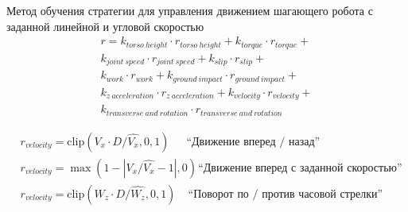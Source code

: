 \begin{frame}{Метод обучения стратегии для управления движением
шагающего робота с заданной линейной и угловой скоростью}
\begin{multline*}
    r = k_{torso\ height} \cdot r_{torso\ height} +
    k_{torque} \cdot r_{torque} +\\
    k_{joint\ speed} \cdot r_{joint\ speed} +
    k_{slip} \cdot r_{slip} +\\
    k_{work} \cdot r_{work} + 
    k_{ground\ impact} \cdot r_{ground\ impact} +\\
    k_{z\ acceleration} \cdot r_{z\ acceleration} +  k_{velocity} \cdot r_{velocity} +\\
    k_{transverse\ and\ rotation} \cdot r_{transverse\ and\ rotation}
\label{eq:unitree_reward}
\end{multline*}

\begin{align*}
& r_{velocity} = \mathrm{clip}(V_x \cdot D / \hat{V_x}, 0, 1) \hspace{18pt}\text{``Движение вперед / назад''}\\
& r_{velocity} = \max(1 - |V_x / \hat{V_x} - 1|, 0) \hspace{1pt}\text{``Движение вперед с заданной скоростью''}\\
& r_{velocity} = \mathrm{clip}(W_z \cdot D / \hat{W_z}, 0, 1) \hspace{13pt}\text{``Поворот по / против часовой стрелки''}
\end{align*}
\end{frame}

